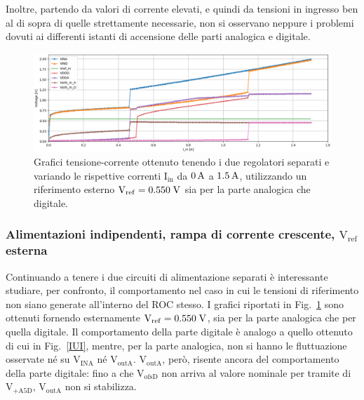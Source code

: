 Inoltre, partendo da valori di corrente elevati, e quindi da tensioni in ingresso ben al di sopra di quelle strettamente necessarie, non si osservano neppure i problemi dovuti ai differenti istanti di accensione delle parti analogica e digitale.%
% 
%
%

\begin{figure}[h]
\centering
\includegraphics[width=\textwidth]{Immagini/IUEVref2}
\caption{Grafici tensione-corrente ottenuto tenendo i due regolatori separati e variando le rispettive correnti $\mathrm{I_{in}}$ da $0\rm \, A$ a $1.5\rm \, A$, utilizzando un riferimento esterno $\mathrm{V_{ref}}=0.550 \rm \; V$ sia per la parte analogica che digitale.}
\label{IUEVref}
\end{figure}

\subsubsection{Alimentazioni indipendenti, rampa di corrente crescente, $\mathrm{V_{ref}}$ esterna} 
Continuando a tenere i due circuiti di alimentazione separati è interessante studiare, per confronto, il comportamento nel caso in cui le tensioni di riferimento non siano generate all'interno del ROC stesso.
I grafici riportati in Fig.~\ref{IUEVref} sono ottenuti fornendo esternamente $\mathrm{V_{ref}}=0.550\rm \; V$,  sia per la parte analogica che per quella digitale.
Il comportamento della parte digitale è analogo a quello ottenuto di cui in Fig.~\ref{IUI}, mentre, per la parte analogica, non si hanno le fluttuazione osservate n\'e su $\mathrm{V_{INA}}$ n\'e $\mathrm{V_{outA}}$. $\mathrm{V_{outA}}$, però, risente ancora del comportamento della parte digitale: fino a che $\mathrm{V_{ofsD}}$ non arriva al valore nominale per tramite di $\mathrm{V_{+A5D}}$, $\mathrm{V_{outA}}$ non si stabilizza.

